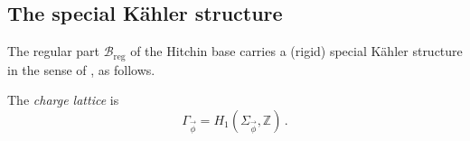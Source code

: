 \documentclass[12pt,letterpaper,reqno]{article}
\numberwithin{equation}{section}
\newcommand{\cB}{\ensuremath{\mathcal B}}
\newcommand{\cM}{\ensuremath{\mathcal M}}
\newcommand{\bbZ}{\ensuremath{\mathbb Z}}
\newcommand{\kahler}{K\"ahler\xspace}
\newcommand{\hk}{hyperk\"ahler\xspace}
\newcommand{\reg}{\mathrm{reg}}
\newcommand{\vphi}{{\vec\phi}}
\newcommand{\ti}[1]{\textit{#1}}
\DeclareMathOperator{\Tr}{Tr}
\newcommand{\U}{\mathrm{U}}
\newcommand{\fixme}[1]{{\color{orange}{[#1]}}}
\begin{document}








\subsection{The special \kahler structure}

The regular part $\cB_\reg$ of the Hitchin base 
carries a (rigid) special \kahler structure 
in the sense of \cite{Freed:1997dp}, as follows.

\begin{example}[Charge lattices for $G = \U(K)$]
The \ti{charge lattice} is
\begin{equation}
    \Gamma_\vphi = H_1(\Sigma_\vphi, \bbZ) \, .
\end{equation}
\end{example}
\end{document}
